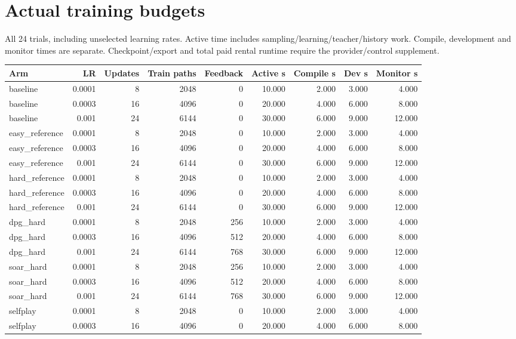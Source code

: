 \documentclass[10pt]{article}
\begin{document}
\section*{Actual training budgets}
All 24 trials, including unselected learning rates. Active time includes sampling/learning/teacher/history work. Compile, development and monitor times are separate. Checkpoint/export and total paid rental runtime require the provider/control supplement.\par
\begingroup\scriptsize
\begin{longtable}{lrrrrrrrr}
\toprule Arm & LR & Updates & Train paths & Feedback & Active s & Compile s & Dev s & Monitor s \\
\midrule
baseline & 0.0001 & 8 & 2048 & 0 & 10.000 & 2.000 & 3.000 & 4.000 \\
baseline & 0.0003 & 16 & 4096 & 0 & 20.000 & 4.000 & 6.000 & 8.000 \\
baseline & 0.001 & 24 & 6144 & 0 & 30.000 & 6.000 & 9.000 & 12.000 \\
easy\_reference & 0.0001 & 8 & 2048 & 0 & 10.000 & 2.000 & 3.000 & 4.000 \\
easy\_reference & 0.0003 & 16 & 4096 & 0 & 20.000 & 4.000 & 6.000 & 8.000 \\
easy\_reference & 0.001 & 24 & 6144 & 0 & 30.000 & 6.000 & 9.000 & 12.000 \\
hard\_reference & 0.0001 & 8 & 2048 & 0 & 10.000 & 2.000 & 3.000 & 4.000 \\
hard\_reference & 0.0003 & 16 & 4096 & 0 & 20.000 & 4.000 & 6.000 & 8.000 \\
hard\_reference & 0.001 & 24 & 6144 & 0 & 30.000 & 6.000 & 9.000 & 12.000 \\
dpg\_hard & 0.0001 & 8 & 2048 & 256 & 10.000 & 2.000 & 3.000 & 4.000 \\
dpg\_hard & 0.0003 & 16 & 4096 & 512 & 20.000 & 4.000 & 6.000 & 8.000 \\
dpg\_hard & 0.001 & 24 & 6144 & 768 & 30.000 & 6.000 & 9.000 & 12.000 \\
soar\_hard & 0.0001 & 8 & 2048 & 256 & 10.000 & 2.000 & 3.000 & 4.000 \\
soar\_hard & 0.0003 & 16 & 4096 & 512 & 20.000 & 4.000 & 6.000 & 8.000 \\
soar\_hard & 0.001 & 24 & 6144 & 768 & 30.000 & 6.000 & 9.000 & 12.000 \\
selfplay & 0.0001 & 8 & 2048 & 0 & 10.000 & 2.000 & 3.000 & 4.000 \\
selfplay & 0.0003 & 16 & 4096 & 0 & 20.000 & 4.000 & 6.000 & 8.000 \\

\end{longtable}
\end{document}
